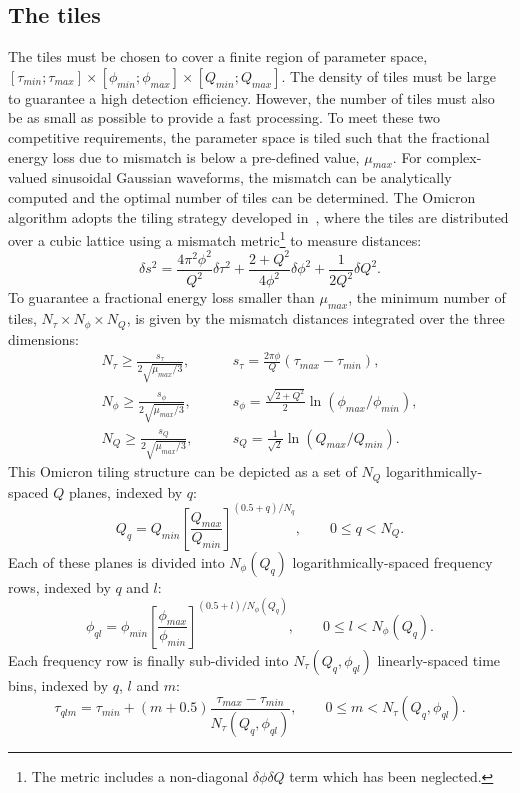 \subsection{The tiles} \label{sec:method:tiles}
The tiles must be chosen to cover a finite region of parameter space, $[\tau_{min};\tau_{max}]\times [\phi_{min};\phi_{max}] \times [Q_{min};Q_{max}]$. The density of tiles must be large to guarantee a high detection efficiency. However, the number of tiles must also be as small as possible to provide a fast processing. To meet these two competitive requirements, the parameter space is tiled such that the fractional energy loss due to mismatch is below a pre-defined value, $\mu_{max}$. For complex-valued sinusoidal Gaussian waveforms, the mismatch can be analytically computed and the optimal number of tiles can be determined. The Omicron algorithm adopts the tiling strategy developed in~\cite{Chatterji:2004}, where the tiles are distributed over a cubic lattice using a mismatch metric\footnote{The metric includes a non-diagonal $\delta \phi \delta Q$ term which has been neglected.} to measure distances:
\begin{equation}
  \delta s^2 =
  \frac{4\pi^2\phi^2}{Q^2}\delta \tau^2
  + \frac{2+Q^2}{4\phi^2}\delta \phi^2
  + \frac{1}{2Q^2}\delta Q^2.
  \label{eq:tilemetric}
\end{equation}
To guarantee a fractional energy loss smaller than $\mu_{max}$, the minimum number of tiles, $N_\tau \times N_\phi \times N_Q$, is given by the mismatch distances integrated over the three dimensions:
\begin{align}
  N_\tau \ge \frac{s_\tau}{2\sqrt{\mu_{max}/3}},  & \qquad s_\tau = \frac{2\pi\phi}{Q}(\tau_{max} - \tau_{min}), \label{eq:tiledistancetau} \\
  N_\phi \ge \frac{s_\phi}{2\sqrt{\mu_{max}/3}},  & \qquad s_\phi = \frac{\sqrt{2+Q^2}}{2}\ln(\phi_{max}/\phi_{min}), \label{eq:tiledistancephi} \\
  N_Q \ge \frac{s_Q}{2\sqrt{\mu_{max}/3}},  & \qquad s_Q = \frac{1}{\sqrt{2}}\ln(Q_{max}/Q_{min}). \label{eq:tiledistanceq}
\end{align}
This Omicron tiling structure can be depicted as a set of $N_Q$ logarithmically-spaced $Q$ planes, indexed by $q$:
\begin{equation}
  Q_q = Q_{min}\left[ \frac{Q_{max}}{Q_{min}}\right]^{(0.5+q)/N_q}, \qquad 0\le q < N_Q.
  \label{eq:q}
\end{equation}
Each of these planes is divided into $N_\phi(Q_q)$ logarithmically-spaced frequency rows, indexed by $q$ and $l$:
\begin{equation}
  \phi_{ql} = \phi_{min}\left[ \frac{\phi_{max}}{\phi_{min}}\right]^{(0.5+l)/N_\phi(Q_q)}, \qquad 0\le l < N_\phi(Q_q).
  \label{eq:phi}
\end{equation}
Each frequency row is finally sub-divided into $N_\tau(Q_q,\phi_{ql})$ linearly-spaced time bins, indexed by $q$, $l$ and $m$:
\begin{equation}
  \tau_{qlm} = \tau_{min}+(m+0.5)\frac{\tau_{max}-\tau_{min}}{N_\tau(Q_q,\phi_{ql})}, \qquad 0\le m < N_\tau(Q_q,\phi_{ql}).
  \label{eq:tau}
\end{equation}


